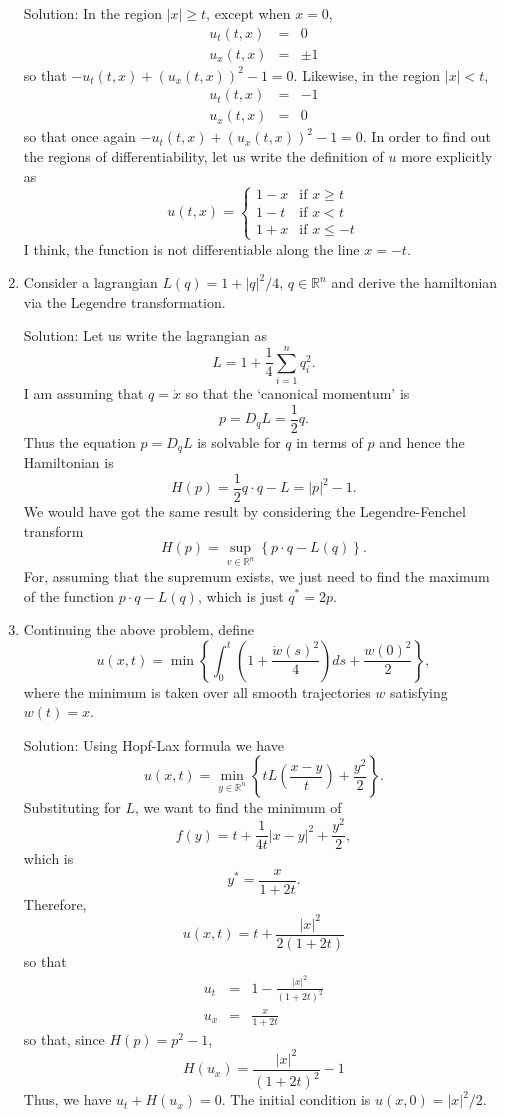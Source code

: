 \documentclass{article}
\theoremstyle{plain}
\numberwithin{thm}{section}
\theoremstyle{plain}
\numberwithin{prop}{section}
\theoremstyle{definition}
\numberwithin{defn}{section}
\theoremstyle{remark}
\numberwithin{equation}{section}
\begin{document}
\begin{enumerate}
\noindent Solution: In the region $|x| \ge t$, except when $x = 0$,
\begin{eqnarray*}
u_t(t, x) &=& 0 \\
u_x(t, x) &=& \pm 1
\end{eqnarray*}
so that $-u_t(t, x) + (u_x(t, x))^2 - 1 = 0$. Likewise, in the region $|x| < t$,
\begin{eqnarray*}
u_t(t, x) &=& -1 \\
u_x(t, x) &=& 0 
\end{eqnarray*}
so that once again $-u_t(t, x) + (u_x(t, x))^2 - 1 = 0$. In order to find out the regions of 
differentiability, let us write the definition of $u$ more explicitly as
\[
u(t, x) = \begin{cases}
1 - x & \text{if } x \ge t \\
1 - t & \text{if } x < t \\
1 + x & \text{if } x \le -t
\end{cases}
\]
I think, the function is not differentiable along the line $x = -t$.

\item Consider a lagrangian $L(q) = 1 + |q|^2/4$, $q \in \mathbb{R}^n$ and derive the hamiltonian via
the Legendre transformation.

\noindent Solution: Let us write the lagrangian as
\[
L = 1 + \frac{1}{4}\sum_{i=1}^n q_i^2.
\]
I am assuming that $q = \dot{x}$ so that the `canonical momentum' is
\[
p = D_qL = \frac{1}{2}q.
\]
Thus the equation $p = D_q L$ is solvable for $q$ in terms of $p$ and hence the Hamiltonian is
\[
H(p) = \frac{1}{2}q\cdot q - L = |p|^2 - 1.
\]
We would have got the same result by considering the Legendre-Fenchel transform
\[
H(p) = \sup_{v \in \mathbb{R}^n}\left\{p \cdot q - L(q)\right\}.
\]
For, assuming that the supremum exists, we just need to find the maximum of the function $p \cdot q -
L(q)$, which is just $q^\ast = 2p$.

\item Continuing the above problem, define
\[
u(x, t) = \min\left\{\int_0^t\left(1 + \frac{\dot{w}(s)^2}{4}\right)ds + \frac{w(0)^2}{2}\right\},
\]
where the minimum is taken over all smooth trajectories $w$ satisfying $w(t) = x$.

\noindent Solution: Using Hopf-Lax formula we have
\[
u(x, t) = \min_{y \in \mathbb{R}^n}\left\{tL\left(\frac{x - y}{t}\right) + \frac{y^2}{2}\right\}.
\]
Substituting for $L$, we want to find the minimum of 
\[
f(y) = t + \frac{1}{4t}|x - y|^2 + \frac{y^2}{2},
\]
which is
\[
y^\ast = \frac{x}{1 + 2t}.
\]
Therefore,
\[
u(x, t) = t + \frac{|x|^2}{2(1 + 2t)}
\]
so that
\begin{eqnarray*}
u_t &=& 1 - \frac{|x|^2}{(1 + 2t)^2} \\
u_x &=& \frac{x}{1 + 2t}
\end{eqnarray*}
so that, since $H(p) = p^2 - 1$,
\[
H(u_x) = \frac{|x|^2}{(1 + 2t)^2} - 1
\]
Thus, we have $u_t + H(u_x) = 0$. The initial condition is $u(x, 0) = |x|^2/2$.


\end{enumerate}
\end{document}
